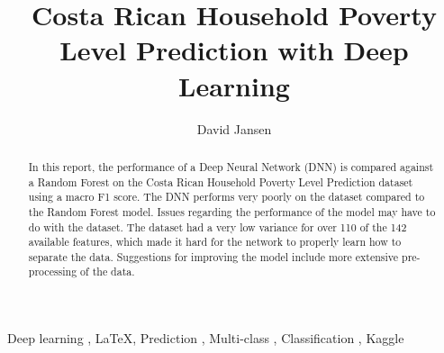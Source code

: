 \documentclass[preprint,12pt]{elsarticle}
\begin{document}
\begin{frontmatter}


\title{Costa Rican Household Poverty Level Prediction with Deep Learning}




\author{David Jansen}

\address{Groningen, Netherlands}

\begin{abstract}
In this report, the performance of a Deep Neural Network (DNN) is compared against a Random Forest on the Costa Rican Household Poverty Level Prediction dataset using a macro F1 score. The DNN performs very poorly on the dataset compared to the Random Forest model. Issues regarding the performance of the model may have to do with the dataset. The dataset had a very low variance for over 110 of the 142 available features, which made it hard for the network to properly learn how to separate the data. Suggestions for improving the model include more extensive pre-processing of the data.
\end{abstract}

\begin{keyword}
Deep learning \sep 
\LaTeX \sep 
Prediction \sep 
Multi-class \sep 
Classification \sep
Kaggle

\end{keyword}

\end{frontmatter}
\end{document}
